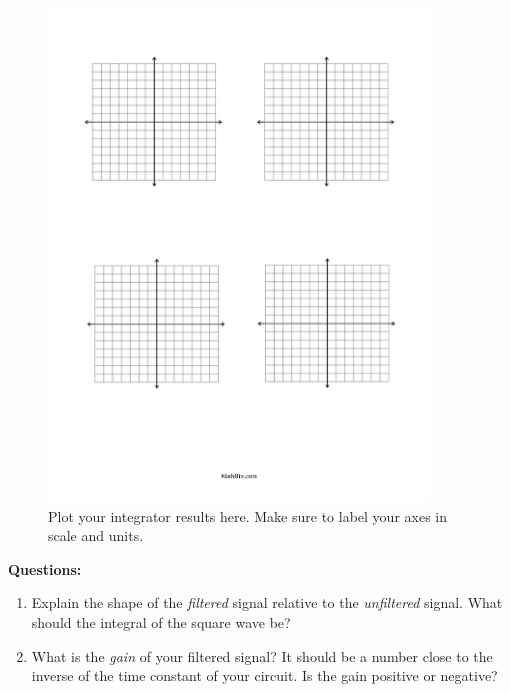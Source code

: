 \documentclass[12pt]{article}
\begin{document}
\begin{figure}[ht]
\centering
\includegraphics[width=0.9\textwidth,trim=0cm 18cm 0cm 2cm,clip=true]{axes.pdf}
\caption{\label{fig:axes} Plot your integrator results here. Make sure to label your axes in scale and units.}
\end{figure}

\vspace{5cm}

\textbf{Questions:}
\begin{enumerate}
\item Explain the shape of the \textit{filtered} signal relative to the \textit{unfiltered} signal. What should the integral of the square wave be? \\ \vspace{1.5cm}
\item What is the \textit{gain} of your filtered signal?  It should be a number close to the inverse of the time constant of your circuit. Is the gain positive or negative? \\ \vspace{1.5cm}
\end{enumerate}
\end{document}
